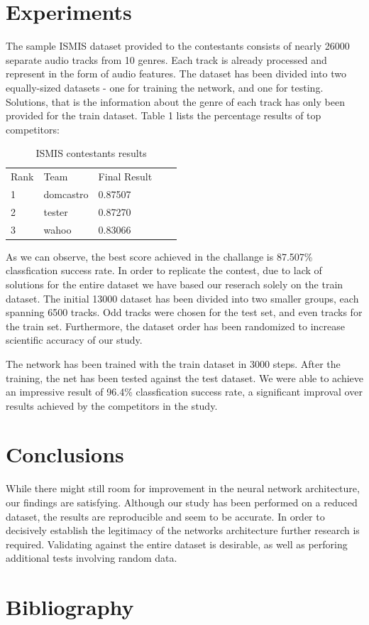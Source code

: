 \documentclass[journal, a4paper]{IEEEtran}
\begin{document}
\section{Experiments}
The sample ISMIS dataset provided to the contestants consists of nearly 26000 separate audio tracks from 10 genres. Each track is already processed and represent in the form of audio features. The dataset has been divided into two equally-sized datasets - one for training the network, and one for testing. Solutions, that is the information about the genre of each track has only been provided for the train dataset. Table 1 lists the percentage results of top competitors:
\begin{table}[h]
\centering
\caption{ISMIS contestants results}
\label{my-label}
\begin{tabular}{|l|l|l|ll}
\cline{1-3}
Rank & Team      & Final Result &  &  \\ \cline{1-3}
1    & domcastro & 0.87507      &  &  \\ \cline{1-3}
2    & tester    & 0.87270      &  &  \\ \cline{1-3}
3    & wahoo     & 0.83066      &  &  \\ \cline{1-3}
\end{tabular}
\end{table}

As we can observe, the best score achieved in the challange is 87.507\% classfication success rate. 
In order to replicate the contest, due to lack of solutions for the entire dataset we have based our reserach solely on the train dataset. The initial 13000 dataset has been divided into two smaller groups, each spanning 6500 tracks. Odd tracks were chosen for the test set, and even tracks for the train set. Furthermore, the dataset order has been randomized to increase scientific accuracy of our study. 

The network has been trained with the train dataset in 3000 steps. After the training, the net has been tested against the test dataset. We were able to achieve an impressive result of 96.4\% classfication success rate, a significant improval over results achieved by the competitors in the study. 

\section{Conclusions}

While there might still room for improvement in the neural network architecture, our findings are satisfying. Although our study has been performed on a reduced dataset, the results are reproducible and seem to be accurate. In order to decisively establish the legitimacy of the networks architecture further research is required. Validating against the entire dataset is desirable, as well as perforing additional tests involving random data.
\section{Bibliography}
\end{document}

